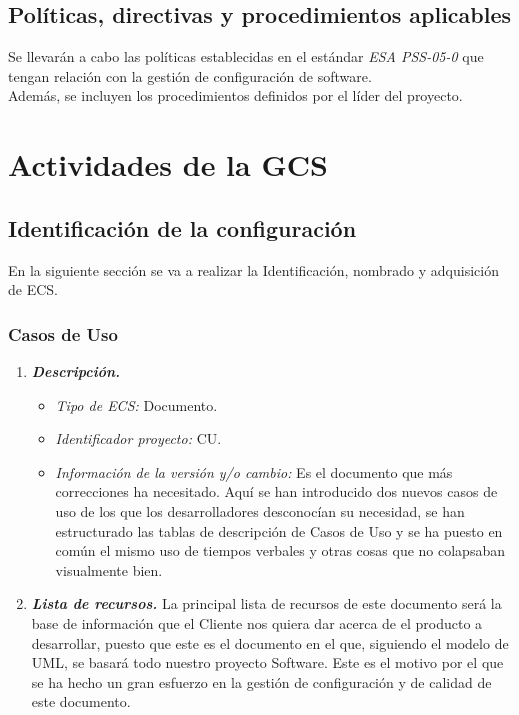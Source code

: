 \documentclass[11pt, a4paper, twoside, titlepage]{article}
\begin{document}
		\subsection{Políticas, directivas y procedimientos aplicables}
			Se llevarán a cabo las políticas establecidas en el estándar \textit{ESA PSS-05-0} que tengan relación con la gestión de configuración de software. \\
			Además, se incluyen los procedimientos definidos por el líder del proyecto.

	\section{Actividades de la GCS}
		\subsection{Identificación de la configuración} %
			En la siguiente sección se va a realizar la Identificación, nombrado y adquisición de \gls{ECS}.

			\subsubsection{Casos de Uso}
				\begin{enumerate}
					\item {\itshape \bfseries Descripción.}
						\begin{itemize}
							\item \textit{Tipo de ECS:} Documento.
							\item \textit{Identificador proyecto:} CU.
							\item \textit{Información de la versión y/o cambio:} Es el documento que más correcciones ha necesitado. Aquí se han introducido dos nuevos casos de uso de los que los desarrolladores desconocían su necesidad, se han estructurado las tablas de descripción de Casos de Uso y se ha puesto en común el mismo uso de tiempos verbales y otras cosas que no colapsaban visualmente bien.
						\end{itemize}

					\item {\itshape \bfseries Lista de recursos.}
						La principal lista de recursos de este documento será la base de información que el Cliente nos quiera dar acerca de el producto a desarrollar, puesto que este es el documento en el que, siguiendo el modelo de UML, se basará todo nuestro proyecto Software. Este es el motivo por el que se ha hecho un gran esfuerzo en la gestión de configuración y de calidad de este documento.
				\end{enumerate}
\end{document}
